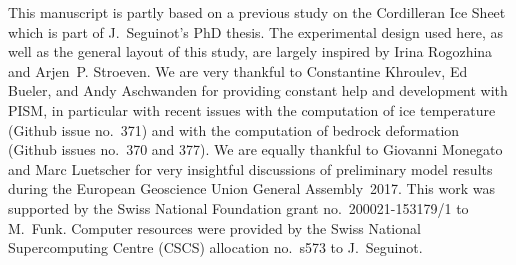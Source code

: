 \documentclass[tc, manuscript]{copernicus}
\begin{document}
\begin{acknowledgements}

    This manuscript is partly based on a previous study on the Cordilleran Ice
    Sheet which is part of J.~Seguinot's PhD thesis. The experimental design
    used here, as well as the general layout of this study, are largely
    inspired by Irina Rogozhina and Arjen~P. Stroeven. We are very thankful to
    Constantine Khroulev, Ed Bueler, and Andy Aschwanden for providing constant
    help and development with PISM, in particular with recent issues with the
    computation of ice temperature (Github issue no.~371) and with the
    computation of bedrock deformation (Github issues no.~370 and 377). We are
    equally thankful to Giovanni Monegato and Marc Luetscher for very
    insightful discussions of preliminary model results during the European
    Geoscience Union General Assembly~2017. This work was supported by the
    Swiss National Foundation grant no.~200021-153179/1 to M.~Funk. Computer
    resources were provided by the Swiss National Supercomputing Centre (CSCS)
    allocation no.~s573 to J.~Seguinot.

\end{acknowledgements}







\end{document}
